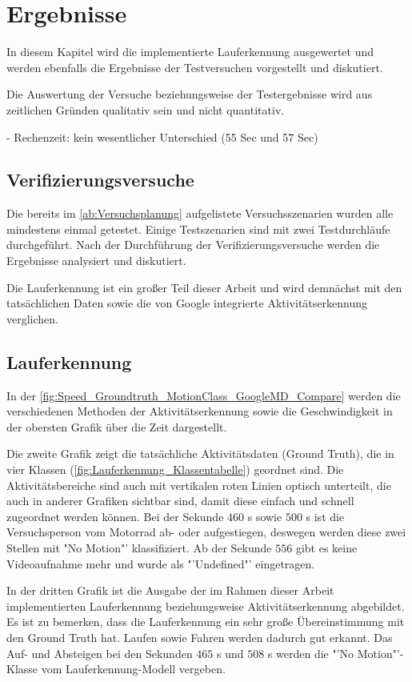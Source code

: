 \chapter{Ergebnisse}

In diesem Kapitel wird die implementierte Lauferkennung ausgewertet und werden ebenfalls die Ergebnisse der Testversuchen vorgestellt und diskutiert.

Die Auswertung der Versuche beziehungsweise der Testergebnisse wird aus zeitlichen Gründen qualitativ sein und nicht quantitativ.


- Rechenzeit: kein wesentlicher Unterschied (55 Sec und 57 Sec)

\section{Verifizierungsversuche}

Die bereits im \autoref{ab:Versuchsplanung} aufgelistete Versuchsszenarien wurden alle mindestens einmal getestet. Einige Testszenarien sind mit zwei Testdurchläufe durchgeführt.
Nach der Durchführung der Verifizierungsversuche werden die Ergebnisse analysiert und diskutiert. 

Die Lauferkennung ist ein großer Teil dieser Arbeit und wird demnächst mit den tatsächlichen Daten sowie die von Google integrierte Aktivitätserkennung verglichen.
\section{Lauferkennung}

In der \autoref{fig:Speed_Groundtruth_MotionClass_GoogleMD_Compare} werden die verschiedenen Methoden der Aktivitätserkennung sowie die Geschwindigkeit in der obersten Grafik über die Zeit dargestellt.

Die zweite Grafik zeigt die tatsächliche Aktivitätsdaten (Ground Truth), die in vier Klassen (\autoref{fig:Lauferkennung_Klassentabelle}) geordnet sind. Die Aktivitätsbereiche sind auch mit vertikalen roten Linien optisch unterteilt, die auch in anderer Grafiken sichtbar sind, damit diese einfach und schnell zugeordnet werden können. Bei der Sekunde $460$ s sowie $500$ s ist die Versuchsperson vom Motorrad ab- oder aufgestiegen, deswegen werden diese zwei Stellen mit "No Motion"' klassifiziert. Ab der Sekunde $556$ gibt es keine Videoaufnahme mehr und wurde als "'Undefined"' eingetragen.

In der dritten Grafik ist die Ausgabe der im Rahmen dieser Arbeit implementierten Lauferkennung beziehungsweise Aktivitätserkennung abgebildet. 
Es ist zu bemerken, dass die Lauferkennung ein sehr große Übereinstimmung mit den Ground Truth hat. Laufen sowie Fahren werden dadurch gut erkannt. Das Auf- und Absteigen bei den Sekunden $465$ s und $508$ s werden die "'No Motion"'-Klasse vom Lauferkennung-Modell vergeben.

